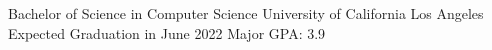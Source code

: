 \documentclass[12pt, letterpaper]{awesome-cv}
\begin{document}
\makecvheader


\begin{cventries}
  \cventry
    {Bachelor of Science in Computer Science} %
    {University of California Los Angeles} %
    {Expected Graduation in June 2022} %
    {Major GPA: 3.9} %
    {
    }
  \vspace{-0.2in}
\end{cventries}
\end{document}
